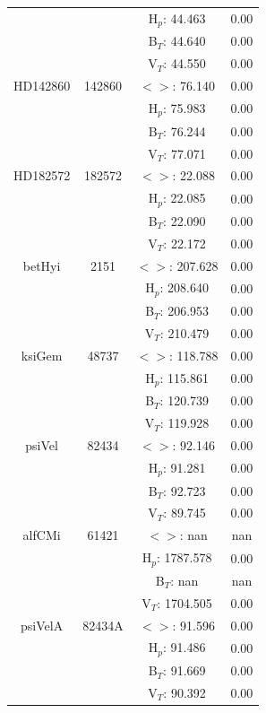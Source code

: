 \begin{tabular}{cccc}
 & & H$_p$: 44.463 &0.00 \\
 & & B$_T$: 44.640 &0.00 \\
 & & V$_T$: 44.550 &0.00 \\
HD142860 & 142860 & $<>$: 76.140 & 0.00 \\
 & & H$_p$: 75.983 &0.00 \\
 & & B$_T$: 76.244 &0.00 \\
 & & V$_T$: 77.071 &0.00 \\
HD182572 & 182572 & $<>$: 22.088 & 0.00 \\
 & & H$_p$: 22.085 &0.00 \\
 & & B$_T$: 22.090 &0.00 \\
 & & V$_T$: 22.172 &0.00 \\
betHyi & 2151 & $<>$: 207.628 & 0.00 \\
 & & H$_p$: 208.640 &0.00 \\
 & & B$_T$: 206.953 &0.00 \\
 & & V$_T$: 210.479 &0.00 \\
ksiGem & 48737 & $<>$: 118.788 & 0.00 \\
 & & H$_p$: 115.861 &0.00 \\
 & & B$_T$: 120.739 &0.00 \\
 & & V$_T$: 119.928 &0.00 \\
psiVel & 82434 & $<>$: 92.146 & 0.00 \\
 & & H$_p$: 91.281 &0.00 \\
 & & B$_T$: 92.723 &0.00 \\
 & & V$_T$: 89.745 &0.00 \\
alfCMi & 61421 & $<>$: nan & nan \\
 & & H$_p$: 1787.578 &0.00 \\
 & & B$_T$: nan &nan \\
 & & V$_T$: 1704.505 &0.00 \\
psiVelA & 82434A & $<>$: 91.596 & 0.00 \\
 & & H$_p$: 91.486 &0.00 \\
 & & B$_T$: 91.669 &0.00 \\
 & & V$_T$: 90.392 &0.00 \\
\hline
\end{tabular}
